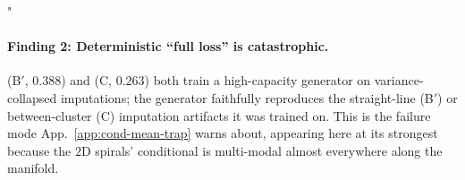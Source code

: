 "\documentclass{article}
\theoremstyle{plain}
\theoremstyle{definition}
\theoremstyle{remark}
\begin{document}
\begin{table}[h]
\centering
\caption{Point (MSE/MAE), distributional (ES), and downstream (disc) metrics on the two-spirals toy at $p = 0.60$ ($M=50$ posterior samples, $5$ reps). MSE/MAE invert the disc ordering (MSE-optimal B$'$ is disc-worst, highest-MSE F is second-best disc); the Energy Score~\citep{gneiting2007strictly} ranks identically to disc.}
\label{tab:toy-mse-trap}
\end{table}

\paragraph{Finding 2: Deterministic ``full loss'' is catastrophic.}
(B$'$, $0.388$) and (C, $0.263$) both train a high-capacity generator on variance-collapsed imputations; the generator faithfully reproduces the straight-line (B$'$) or between-cluster (C) imputation artifacts it was trained on. This is the failure mode App.~\ref{app:cond-mean-trap} warns about, appearing here at its strongest because the $2$D spirals' conditional is multi-modal almost everywhere along the manifold.
\end{document}
